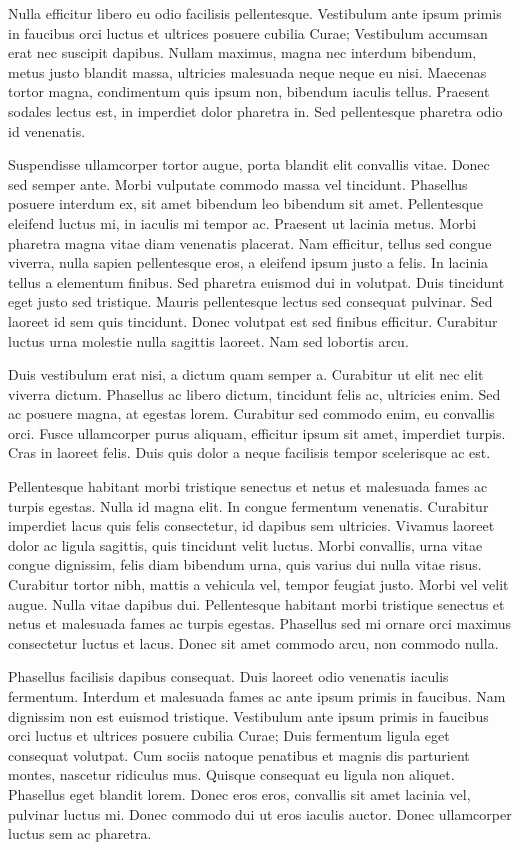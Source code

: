 \documentclass[12pt, letterpaper,twocolumn]{article}
\begin{document}
Nulla efficitur libero eu odio facilisis pellentesque. Vestibulum ante ipsum primis in faucibus orci luctus et ultrices posuere cubilia Curae; Vestibulum accumsan erat nec suscipit dapibus. Nullam maximus, magna nec interdum bibendum, metus justo blandit massa, ultricies malesuada neque neque eu nisi. Maecenas tortor magna, condimentum quis ipsum non, bibendum iaculis tellus. Praesent sodales lectus est, in imperdiet dolor pharetra in. Sed pellentesque pharetra odio id venenatis.

Suspendisse ullamcorper tortor augue, porta blandit elit convallis vitae. Donec sed semper ante. Morbi vulputate commodo massa vel tincidunt. Phasellus posuere interdum ex, sit amet bibendum leo bibendum sit amet. Pellentesque eleifend luctus mi, in iaculis mi tempor ac. Praesent ut lacinia metus. Morbi pharetra magna vitae diam venenatis placerat. Nam efficitur, tellus sed congue viverra, nulla sapien pellentesque eros, a eleifend ipsum justo a felis. In lacinia tellus a elementum finibus. Sed pharetra euismod dui in volutpat. Duis tincidunt eget justo sed tristique. Mauris pellentesque lectus sed consequat pulvinar. Sed laoreet id sem quis tincidunt. Donec volutpat est sed finibus efficitur. Curabitur luctus urna molestie nulla sagittis laoreet. Nam sed lobortis arcu.

Duis vestibulum erat nisi, a dictum quam semper a. Curabitur ut elit nec elit viverra dictum. Phasellus ac libero dictum, tincidunt felis ac, ultricies enim. Sed ac posuere magna, at egestas lorem. Curabitur sed commodo enim, eu convallis orci. Fusce ullamcorper purus aliquam, efficitur ipsum sit amet, imperdiet turpis. Cras in laoreet felis. Duis quis dolor a neque facilisis tempor scelerisque ac est.

Pellentesque habitant morbi tristique senectus et netus et malesuada fames ac turpis egestas. Nulla id magna elit. In congue fermentum venenatis. Curabitur imperdiet lacus quis felis consectetur, id dapibus sem ultricies. Vivamus laoreet dolor ac ligula sagittis, quis tincidunt velit luctus. Morbi convallis, urna vitae congue dignissim, felis diam bibendum urna, quis varius dui nulla vitae risus. Curabitur tortor nibh, mattis a vehicula vel, tempor feugiat justo. Morbi vel velit augue. Nulla vitae dapibus dui. Pellentesque habitant morbi tristique senectus et netus et malesuada fames ac turpis egestas. Phasellus sed mi ornare orci maximus consectetur luctus et lacus. Donec sit amet commodo arcu, non commodo nulla.

Phasellus facilisis dapibus consequat. Duis laoreet odio venenatis iaculis fermentum. Interdum et malesuada fames ac ante ipsum primis in faucibus. Nam dignissim non est euismod tristique. Vestibulum ante ipsum primis in faucibus orci luctus et ultrices posuere cubilia Curae; Duis fermentum ligula eget consequat volutpat. Cum sociis natoque penatibus et magnis dis parturient montes, nascetur ridiculus mus. Quisque consequat eu ligula non aliquet. Phasellus eget blandit lorem. Donec eros eros, convallis sit amet lacinia vel, pulvinar luctus mi. Donec commodo dui ut eros iaculis auctor. Donec ullamcorper luctus sem ac pharetra.
\end{document}
